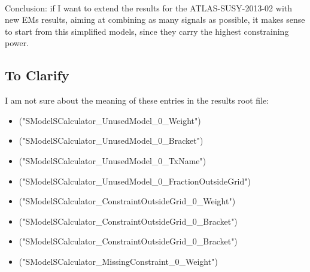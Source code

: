 \documentclass[a4paper,11pt]{article}
\begin{document}
\\

Conclusion: if I want to extend the results for the ATLAS-SUSY-2013-02 with new EMs results, aiming at combining as many signals as possible, it makes sense to start from this simplified models, since they carry the highest constraining power. 

\subsection{To Clarify}
I am not sure about the meaning of these entries in the results root file:
\begin{itemize}
	\item ("SModelSCalculator\_UnusedModel\_0\_Weight")
	\item ("SModelSCalculator\_UnusedModel\_0\_Bracket") 
	\item ("SModelSCalculator\_UnusedModel\_0\_TxName") 
	\item ("SModelSCalculator\_UnusedModel\_0\_FractionOutsideGrid") 
	\item ("SModelSCalculator\_ConstraintOutsideGrid\_0\_Weight") 
	\item ("SModelSCalculator\_ConstraintOutsideGrid\_0\_Bracket") 
	\item ("SModelSCalculator\_ConstraintOutsideGrid\_0\_Bracket") 
	\item ("SModelSCalculator\_MissingConstraint\_0\_Weight") 
\end{itemize}

\clearpage
\end{document}
